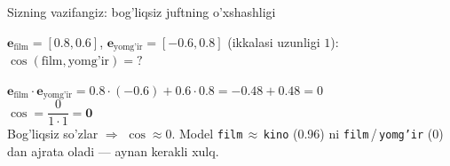 \documentclass[aspectratio=169,11pt]{beamer}
\begin{document}
\begin{frame}{Sizning vazifangiz: bog'liqsiz juftning o'xshashligi}
  \begin{tcolorbox}[warnbox,title=Savol --- 90 soniya]
    \small
    $\mathbf{e}_{\text{film}}=[0.8,0.6]$, \quad
    $\mathbf{e}_{\text{yomg'ir}}=[-0.6,0.8]$ \; (ikkalasi uzunligi $1$):\\[4pt]
    \textbf{\large $\cos(\text{film},\text{yomg'ir}) = ?$}
  \end{tcolorbox}
  \pause
  \begin{tcolorbox}[okbox,title=Javob]
    \small
    $\mathbf{e}_{\text{film}}\cdot\mathbf{e}_{\text{yomg'ir}}
       = 0.8{\cdot}(-0.6) + 0.6{\cdot}0.8 = -0.48+0.48 = 0$\\[3pt]
    $\cos = \dfrac{0}{1\cdot 1} = \mathbf{0}$\\[3pt]
    \footnotesize Bog'liqsiz so'zlar $\Rightarrow$ $\cos \approx 0$. Model
    \texttt{film}\,$\approx$\,\texttt{kino} (0.96) ni \texttt{film}\,/\,\texttt{yomg'ir}
    (0) dan ajrata oladi --- aynan kerakli xulq.
  \end{tcolorbox}
\end{frame}
\end{document}
